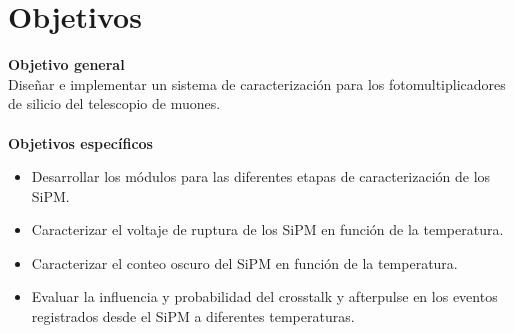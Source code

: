 \chapter*{Objetivos}
\label{Cap:Objetivos}
\noindent \textbf{Objetivo general}\\
Diseñar e implementar un sistema de caracterización para los fotomultiplicadores de silicio del
telescopio de muones.\\ \\

\noindent \textbf{Objetivos específicos}\\
\begin{itemize}
    \item Desarrollar los módulos para las diferentes etapas de caracterización de los SiPM.
    \item Caracterizar el voltaje de ruptura de los SiPM en función de la temperatura.
    \item Caracterizar el conteo oscuro del SiPM en función de la temperatura.
    \item Evaluar la influencia y probabilidad del crosstalk y afterpulse en los eventos registrados desde
el SiPM a diferentes temperaturas.
\end{itemize}
